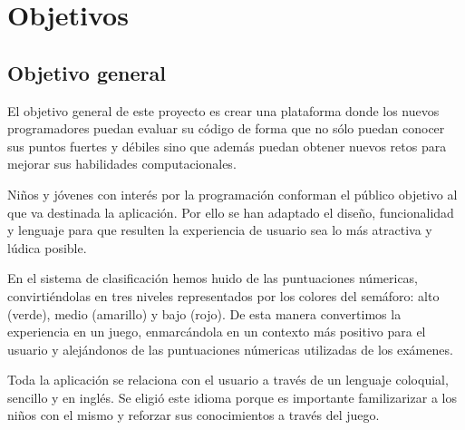 \documentclass[a4paper, 12pt]{book}
\begin{document}

\cleardoublepage
\chapter{Objetivos}
\label{chap:objetivos}

\section{Objetivo general}
\label{sec:objetivo-general} El objetivo general de este proyecto es crear una plataforma donde los nuevos programadores puedan evaluar su código de forma que no sólo puedan conocer sus puntos fuertes y débiles sino que además puedan obtener nuevos retos para mejorar sus habilidades computacionales. 

Niños y jóvenes con interés por la programación conforman el público objetivo al que va destinada la aplicación. Por ello se han adaptado el diseño, funcionalidad y lenguaje para que resulten la experiencia de usuario sea lo más atractiva y lúdica posible. 

En el sistema de clasificación hemos huido de las puntuaciones númericas, convirtiéndolas en tres niveles representados por los colores del semáforo: alto (verde), medio (amarillo) y bajo (rojo). De esta manera convertimos la experiencia en un juego, enmarcándola en un contexto más positivo para el usuario y alejándonos de las puntuaciones númericas utilizadas de los exámenes. 

Toda la aplicación se relaciona con el usuario a través de un lenguaje coloquial, sencillo y en inglés. Se eligió este idioma porque es importante familizarizar a los niños con el mismo y reforzar sus conocimientos a través del juego.
\end{document}
